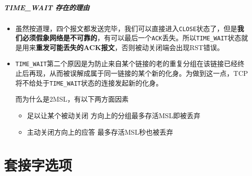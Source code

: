 \documentclass[UTF8,a4paper,8pt]{ctexbook}
\begin{document}
				\subparagraph{TIME\_WAIT 存在的理由}
					\begin{itemize}
						\item  虽然按道理，四个报文都发送完毕，我们可以直接进入\verb|CLOSE|状态了，但是\textbf{我们必须假象网络是不可靠的}，有可以最后一个\verb|ACK|丢失。所以\verb|TIME_WAIT|状态就是用来\textbf{重发可能丢失的ACK报文}，否则被动关闭端会出现RST错误。
						
						\item \verb|TIME_WAIT|第二个原因是为防止来自某个链接的老的重复分组在该链接已经终止后再现，从而被误解成属于同一链接的某个新的化身。为做到这一点，TCP将不给处于\verb|TIME_WAIT|状态的连接发起新的化身。
							
							而为什么是2MSL，有以下两方面因素
							\begin{itemize}
								\item 足以让某个被动关闭 方向上的分组最多存活MSL即被丢弃
								\item 主动关闭方向上的应答 最多存活MSL秒也被丢弃
							\end{itemize}
						
					\end{itemize}
	\section{套接字选项}
\end{document}
